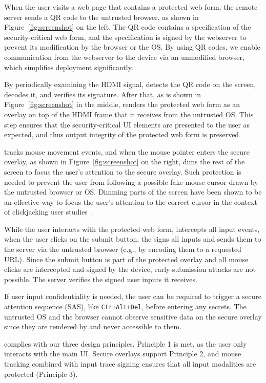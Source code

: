 When the user visits a web page that contains a protected web form, the remote server sends a QR code to the untrusted browser, as shown in Figure~\ref{fig:screenshot} on the left. The QR code contains a specification of the security-critical web form, and the specification is signed by the webserver to prevent its modification by the browser or the OS. By using QR codes, we enable communication from the webserver to the \hub device via an unmodified browser, which simplifies deployment significantly.

By periodically examining the HDMI signal, \hub detects the QR code on the screen, decodes it, and verifies its signature. After that, as is shown in Figure~\ref{fig:screenshot} in the middle, \hub renders the protected web form as an overlay on top of the HDMI frame that it receives from the untrusted OS. This step ensures that the security-critical UI elements are presented to the user as expected, and thus output integrity of the protected web form is preserved.

\hub tracks mouse movement events, and when the mouse pointer enters the secure overlay, as shown in Figure~\ref{fig:screenshot} on the right, \hub dims the rest of the screen to focus the user's attention to the secure overlay. Such protection is needed to prevent the user from following a possible fake mouse cursor drawn by the untrusted browser or OS. Dimming parts of the screen have been shown to be an effective way to focus the user's attention to the correct cursor in the context of clickjacking user studies~\cite{huang2012clickjacking}.

While the user interacts with the protected web form, \hub intercepts all input events, when the user clicks on the submit button, the \hub signs all inputs and sends them to the server via the untrusted browser (e.g., by encoding them to a requested URL). Since the submit button is part of the protected overlay and all mouse clicks are intercepted and signed by the \hub device, early-submission attacks are not possible. The server verifies the signed user inputs it receives. 

If user input confidentiality is needed, the user can be required to trigger a secure attention sequence (SAS), like \texttt{Ctr+Alt+Del}, before entering any secrets. The untrusted OS and the browser cannot observe sensitive data on the secure overlay since they are rendered by \hub and never accessible to them.

\protection complies with our three design principles. Principle 1 is met, as the user only interacts with the main UI. Secure overlays support Principle 2, and mouse tracking combined with input trace signing ensures that all input modalities are protected (Principle 3).

